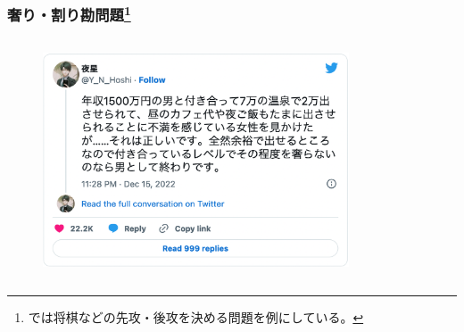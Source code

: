 \begin{frame}
  \frametitle{%
    奢り・割り勘問題\footnote{%
      \cite{covert_lottery_2021}では将棋などの先攻・後攻を決める問題を例にしている。%
    }%
  }

  \begin{columns}
    \begin{column}{0.7\textwidth}
      \begin{figure}[h]
        \includegraphics[width=0.85\textwidth]{./img/twitter.png}\cite{Y_N_Hoshi}
      \end{figure}
    \end{column}
    \begin{column}{0.3\textwidth}
    \end{column}
  \end{columns}
\end{frame}

